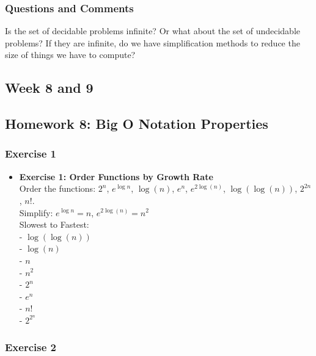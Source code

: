 \documentclass{article}
\theoremstyle{theorem}
\theoremstyle{definition}
\theoremstyle{remark}
\begin{document}
\subsubsection{Questions and Comments}
Is the set of decidable problems infinite? Or what about the set of undecidable problems? If they are infinite, do we have simplification methods to reduce the size of things we have to compute?


\subsection{Week 8 and 9}

\subsection{Homework 8: Big O Notation Properties}

\subsubsection{Exercise 1}

\begin{itemize}
    \item \textbf{Exercise 1: Order Functions by Growth Rate} \\
    Order the functions: \( 2^n \), \( e^{\log n} \), \( \log(n) \), \( e^n \), \( e^{2 \log(n)} \), \( \log(\log(n)) \), \( 2^{2n} \), \( n! \). \\
    Simplify: \( e^{\log n} = n \), \( e^{2 \log(n)} = n^2 \) \\
    Slowest to Fastest: \\
    - \( \log(\log(n)) \) \\
    - \( \log(n) \) \\
    - \( n \) \\
    - \( n^2 \) \\
    - \( 2^n \) \\
    - \( e^n \) \\ 
    - \( n! \) \\
    - \( 2^{2{^n}} \) \\
\end{itemize}

\subsubsection{Exercise 2}
\end{document}
